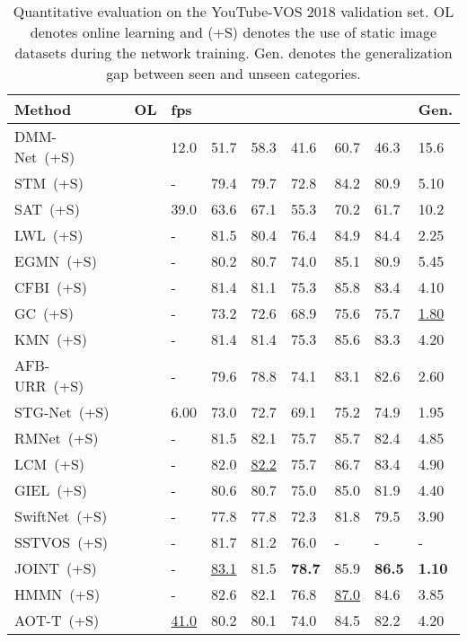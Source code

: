 \documentclass[runningheads]{llncs}
\begin{document}
\begin{table}[h!]
	\centering 
	\caption{Quantitative evaluation on the YouTube-VOS 2018 validation set. OL denotes online learning and (+S) denotes the use of static image datasets during the network training. Gen. denotes the generalization gap between seen and unseen categories.}
	\begin{tabular}{lP{0.8cm}P{1cm}P{1cm}P{1cm}P{1cm}P{1cm}P{1cm}P{1cm}}
		\toprule
		Method &OL &fps & & & & & &Gen.\\
		\midrule
        DMM-Net~(+S)~\cite{DMM-Net} & &12.0 &51.7 &58.3 &41.6 &60.7 &46.3 &15.6\\
		STM~(+S)~\cite{STM} & &- &79.4 &79.7 &72.8 &84.2 &80.9 &5.10\\
		SAT~(+S)~\cite{SAT} & &39.0 &63.6 &67.1 &55.3 &70.2 &61.7 &10.2\\
		LWL~(+S)~\cite{LWL} &\checkmark &- &81.5 &80.4 &76.4 &84.9 &84.4 &2.25\\
        EGMN~(+S)~\cite{EGMN} & &- &80.2 &80.7 &74.0 &85.1 &80.9 &5.45\\
		CFBI~(+S)~\cite{CFBI} & &- &81.4 &81.1 &75.3 &85.8 &83.4 &4.10\\
		GC~(+S)~\cite{GC} & &- &73.2 &72.6 &68.9 &75.6 &75.7 &\underline{1.80}\\
		KMN~(+S)~\cite{KMN} & &- &81.4 &81.4 &75.3 &85.6 &83.3 &4.20\\
        AFB-URR~(+S)~\cite{AFB-URR} & &- &79.6 &78.8 &74.1 &83.1 &82.6 &2.60\\
		STG-Net~(+S)~\cite{STG-Net} & &6.00 &73.0 &72.7 &69.1 &75.2 &74.9 &1.95\\
		RMNet~(+S)~\cite{RMNet} & &- &81.5 &82.1 &75.7 &85.7 &82.4 &4.85\\
		LCM~(+S)~\cite{LCM} & &- &82.0 &\underline{82.2} &75.7 &86.7 &83.4 &4.90\\
		GIEL~(+S)~\cite{GIEL} & &- &80.6 &80.7 &75.0 &85.0 &81.9 &4.40\\
		SwiftNet~(+S)~\cite{SwiftNet} & &- &77.8 &77.8 &72.3 &81.8 &79.5 &3.90\\
		SSTVOS~(+S)~\cite{SSTVOS} & &- &81.7 &81.2 &76.0 &- &- &-\\
		JOINT~(+S)~\cite{JOINT} &\checkmark &- &\underline{83.1} &81.5 &\textbf{78.7} &85.9 &\textbf{86.5} &\textbf{1.10}\\
		HMMN~(+S)~\cite{HMMN} & &- &82.6 &82.1 &76.8 &\underline{87.0} &84.6 &3.85\\
		AOT-T~(+S)~\cite{AOT} & &\underline{41.0} &80.2 &80.1 &74.0 &84.5 &82.2 &4.20\\

\end{tabular}
\end{table}
\end{document}
